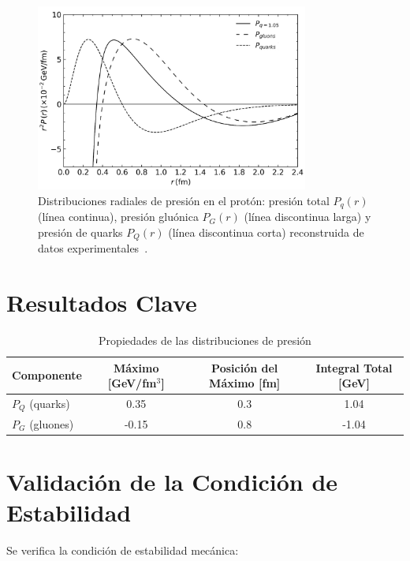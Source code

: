 \begin{figure}[h]
    \centering
    \includegraphics[width=0.8\textwidth]{./Images/PressureDistributionsTot-Q-G.png}
    \caption[Distribuciones radiales de presi\'on en el prot\'on]{Distribuciones radiales de presi\'on en el prot\'on: presi\'on total $P_q(r)$ (l\'inea continua), presi\'on glu\'onica $P_G(r)$ (l\'inea discontinua larga) y presi\'on de quarks $P_Q(r)$ (l\'inea discontinua corta) reconstruida de datos experimentales~\cite{Burkert_2018}.}
    \label{fig:PressureDecomp}
\end{figure}

\break

\section{Resultados Clave}

\begin{table}[h]
    \centering
    \caption{Propiedades de las distribuciones de presi\'on}
    \begin{tabular}{lccc}
    \toprule
    Componente & M\'aximo [GeV/fm$^3$] & Posici\'on del M\'aximo [fm] & Integral Total [GeV] \\
    \midrule
    $P_Q$ (quarks) & 0.35 & 0.3 & 1.04 \\
    $P_G$ (gluones) & -0.15 & 0.8 & -1.04 \\
    \bottomrule
    \end{tabular}
    \label{tab:PressureResults}
\end{table}

\section{Validaci\'on de la Condici\'on de Estabilidad}
Se verifica la condici\'on de estabilidad mec\'anica:

